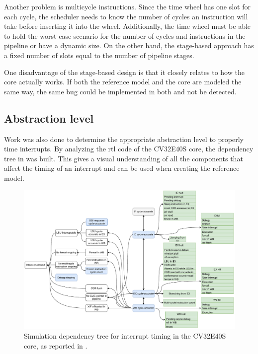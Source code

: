 Another problem is multicycle instructions. Since the time wheel has one slot for each cycle, the scheduler needs to know the number of cycles an instruction will take before inserting it into the wheel. Additionally, the time wheel must be able to hold the worst-case scenario for the number of cycles and instructions in the pipeline or have a dynamic size. On the other hand, the stage-based approach has a fixed number of slots equal to the number of pipeline stages. 

One disadvantage of the stage-based design is that it closely relates to how the core actually works. If both the reference model and the core are modeled the same way, the same bug could be implemented in both and not be detected.


\subsection{Abstraction level}

Work was also done to determine the appropriate abstraction level to properly time interrupts. By analyzing the \acrshort{rtl} code of the CV32E40S core, the dependency tree in  was built. This gives a visual understanding of all the components that affect the timing of an interrupt and can be used when creating the reference model.

\begin{figure}
    \centering
    \includegraphics[width=1.0\linewidth]{figures/dependency_tree_full.pdf}
    \caption{Simulation dependency tree for interrupt timing in the CV32E40S core, as reported in \cite{torjenygaardeikenesDesigningRISCVReference2023}.}
    \label{fig:dependency-tree-cv32x}
\end{figure}


